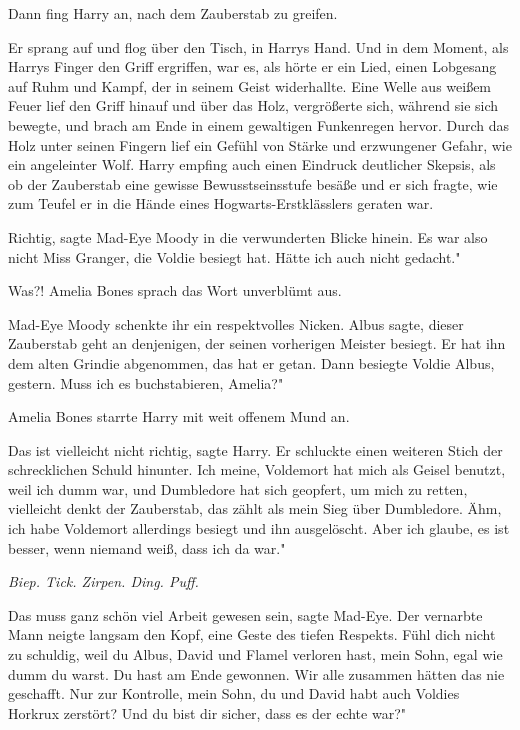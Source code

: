Dann fing Harry an, nach dem Zauberstab zu greifen.

Er sprang auf und flog über den Tisch, in Harrys Hand. Und in dem Moment, als
Harrys Finger den Griff ergriffen, war es, als hörte er ein Lied, einen
Lobgesang auf Ruhm und Kampf, der in seinem Geist widerhallte. Eine Welle aus
weißem Feuer lief den Griff hinauf und über das Holz, vergrößerte sich, während
sie sich bewegte, und brach am Ende in einem gewaltigen Funkenregen hervor.
Durch das Holz unter seinen Fingern lief ein Gefühl von Stärke und erzwungener
Gefahr, wie ein angeleinter Wolf. Harry empfing auch einen Eindruck deutlicher
Skepsis, als ob der Zauberstab eine gewisse Bewusstseinsstufe besäße und er sich
fragte, wie zum Teufel er in die Hände eines Hogwarts-Erstklässlers geraten war.

\glqq Richtig\grqq{}, sagte Mad-Eye Moody in die verwunderten Blicke hinein.
\glqq Es war also nicht Miss Granger, die Voldie besiegt hat. Hätte ich auch
nicht gedacht."

\glqq Was?!\grqq{} Amelia Bones sprach das Wort unverblümt aus.

Mad-Eye Moody schenkte ihr ein respektvolles Nicken. \glqq Albus sagte, dieser
Zauberstab geht an denjenigen, der seinen vorherigen Meister besiegt. Er hat ihn
dem alten Grindie abgenommen, das hat er getan. Dann besiegte Voldie Albus,
gestern. Muss ich es buchstabieren, Amelia?"

Amelia Bones starrte Harry mit weit offenem Mund an.

\glqq Das ist vielleicht nicht richtig\grqq{}, sagte Harry. Er schluckte einen
weiteren Stich der schrecklichen Schuld hinunter. \glqq Ich meine, Voldemort hat
mich als Geisel benutzt, weil ich dumm war, und Dumbledore hat sich geopfert, um
mich zu retten, vielleicht denkt der Zauberstab, das zählt als mein Sieg über
Dumbledore. Ähm, ich habe Voldemort allerdings besiegt und ihn ausgelöscht. Aber
ich glaube, es ist besser, wenn niemand weiß, dass ich da war."

\emph{Biep. Tick. Zirpen. Ding. Puff.}

\glqq Das muss ganz schön viel Arbeit gewesen sein\grqq{}, sagte Mad-Eye. Der
vernarbte Mann neigte langsam den Kopf, eine Geste des tiefen Respekts. \glqq
Fühl dich nicht zu schuldig, weil du Albus, David und Flamel verloren hast, mein
Sohn, egal wie dumm du warst. Du hast am Ende gewonnen. Wir alle zusammen hätten
das nie geschafft. Nur zur Kontrolle, mein Sohn, du und David habt auch Voldies
Horkrux zerstört? Und du bist dir sicher, dass es der echte war?"

